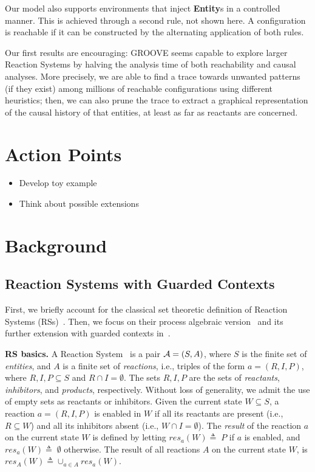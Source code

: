 \documentclass[sn-mathphys-num,a4paper,iicol,lineno,pdflatex]{sn-jnl-hacked}
\newcommand{\lab}[1]{\textsf{#1}}
\newcommand{\blab}[1]{\lab{\bfseries #1}}
\theoremstyle{thmstyleone}%
\theoremstyle{thmstyletwo}%
\theoremstyle{thmstylethree}%
\begin{document}
Our model also supports environments that inject \blab{Entity}s in a controlled manner. This is achieved through a second rule, not shown here. A configuration is reachable if it can be constructed by the alternating application of both rules.

\medskip\noindent
Our first results are encouraging: GROOVE seems capable to explore larger Reaction Systems 
by halving the analysis time of both reachability and causal analyses.
More precisely, we are able to find a trace towards unwanted patterns (if they exist) among millions of reachable configurations using different heuristics; then, we can also prune the trace to extract a graphical representation of the causal history of that entities, at least as far as reactants are concerned.

\section{Action Points}
\begin{itemize}
\item Develop toy example
\item Think about possible extensions
\end{itemize}


\section{Background}

\subsection{Reaction Systems with Guarded Contexts}

First, we briefly account for the classical set theoretic definition of Reaction Systems (RSs)~\cite{DBLP:journals/fuin/EhrenfeuchtR07}. Then, we focus on their process algebraic version~\cite{DBLP:journals/tcs/BrodoBF21} and its further extension with guarded contexts in~\cite{DBLP:conf/cmsb/BowlesBBFGM24}.


\medskip
\noindent
\textbf{RS basics.}
A Reaction System~\cite{DBLP:journals/fuin/EhrenfeuchtR07} is a pair ${\cal A} = (S, A)$, where $S$ is the finite set of \emph{entities}, and $A$ is a finite set of \emph{reactions}, i.e., triples of the form $a = (R,I,P)$, where $R, I, P\subseteq S$ and $R \cap I = \emptyset$. 
The sets $R, I, P$ are the sets of \emph{reactants}, \emph{inhibitors}, and  \emph{products}, respectively. 
Without loss of generality, we admit the use of empty sets as reactants or inhibitors.
%
Given the current state $W\subseteq S$, a reaction $a = (R,I,P)$ is enabled in $W$ if all its reactants are present (i.e., $R\subseteq W$) and all its inhibitors absent (i.e., $W \cap I = \emptyset$).
The \emph{result} of the reaction $a$ on the current state $W$ is defined by letting
$
\mathit{res}_a(W) \triangleq\;
P$ if $a$ is enabled, and
$\mathit{res}_a(W) \triangleq\; \emptyset$ otherwise.
The result of all reactions $A$ on the current state $W$, is $\mathit{res}_A(W) \triangleq \cup_{a \in A} \mathit{res}_a(W)$.
\end{document}
